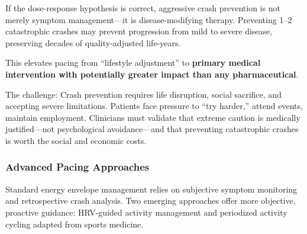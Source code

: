 \begin{keypoint}
If the dose-response hypothesis is correct, aggressive crash prevention is not merely symptom management—it is disease-modifying therapy. Preventing 1--2 catastrophic crashes may prevent progression from mild to severe disease, preserving decades of quality-adjusted life-years.

This elevates pacing from ``lifestyle adjustment'' to \textbf{primary medical intervention with potentially greater impact than any pharmaceutical}.

The challenge: Crash prevention requires life disruption, social sacrifice, and accepting severe limitations. Patients face pressure to ``try harder,'' attend events, maintain employment. Clinicians must validate that extreme caution is medically justified—not psychological avoidance—and that preventing catastrophic crashes is worth the social and economic costs.
\end{keypoint}

\subsubsection{Advanced Pacing Approaches}

Standard energy envelope management relies on subjective symptom monitoring and retrospective crash analysis. Two emerging approaches offer more objective, proactive guidance: HRV-guided activity management and periodized activity cycling adapted from sports medicine.

